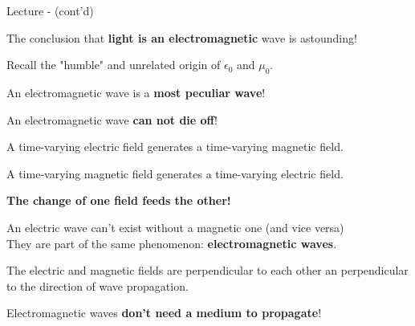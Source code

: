 \begin{frame}{Lecture \summarizedlecture - \lecturesummarytitle (cont'd)}

\begin{itemize}

\item
The conclusion that {\bf light is an electromagnetic} wave is astounding!

\begin{itemize}
{\small
   \item Recall the "humble" and unrelated origin of $\epsilon_0$ and $\mu_0$.
}
\end{itemize}


\item
An electromagnetic wave is a {\bf most peculiar wave}!

   \begin{itemize}
   {\small
     \item An electromagnetic wave  {\bf can not die off}!
             \begin{itemize}
             {\scriptsize
               \item A time-varying electric field generates a time-varying magnetic field.
               \item A time-varying magnetic field generates a time-varying electric  field.
             }
             \end{itemize}
             {\bf The change of one field feeds the other!}

     \vspace{0.1cm}

     \item An electric wave can't exist without a magnetic one (and vice versa)\\
               They are part of the same phenomenon: {\bf electromagnetic waves}.

     \vspace{0.1cm}

     \item The electric and magnetic fields are perpendicular to each
               other an perpendicular to the direction of wave propagation.

     \vspace{0.1cm}

     \item Electromagnetic waves {\bf don't need a medium to propagate}!
   }
   \end{itemize}

\end{itemize}

\end{frame}

